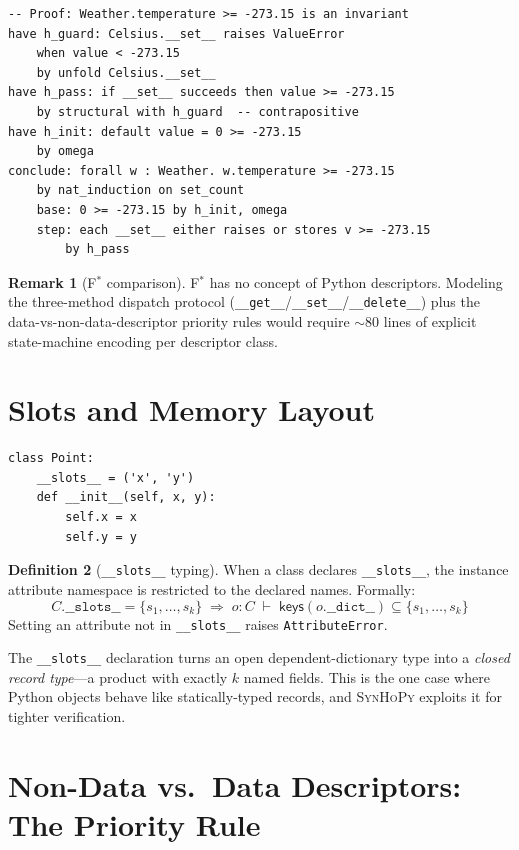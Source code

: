 \documentclass[11pt,a4paper]{report}
\theoremstyle{definition}
\newtheorem{definition}{Definition}[chapter]
\newtheorem{remark}[definition]{Remark}
\theoremstyle{plain}
\newcommand{\fstar}{F$^{*}$}
\newcommand{\synhopy}{\textsc{SynHoPy}}
\begin{document}
\begin{lstlisting}[style=proof]
-- Proof: Weather.temperature >= -273.15 is an invariant
have h_guard: Celsius.__set__ raises ValueError
    when value < -273.15
    by unfold Celsius.__set__
have h_pass: if __set__ succeeds then value >= -273.15
    by structural with h_guard  -- contrapositive
have h_init: default value = 0 >= -273.15
    by omega
conclude: forall w : Weather. w.temperature >= -273.15
    by nat_induction on set_count
    base: 0 >= -273.15 by h_init, omega
    step: each __set__ either raises or stores v >= -273.15
        by h_pass
\end{lstlisting}

\begin{remark}[\fstar{} comparison]
\fstar{} has no concept of Python descriptors.  Modeling the three-method
dispatch protocol (\texttt{\_\_get\_\_}/\texttt{\_\_set\_\_}/\texttt{\_\_delete\_\_})
plus the data-vs-non-data-descriptor priority rules would require $\sim$80
lines of explicit state-machine encoding per descriptor class.
\end{remark}

\section{Slots and Memory Layout}

\begin{lstlisting}[style=python]
class Point:
    __slots__ = ('x', 'y')
    def __init__(self, x, y):
        self.x = x
        self.y = y
\end{lstlisting}

\begin{definition}[\texttt{\_\_slots\_\_} typing]
When a class declares \texttt{\_\_slots\_\_}, the instance attribute namespace
is restricted to the declared names.  Formally:
\[
  C.\texttt{\_\_slots\_\_} = \{s_1, \ldots, s_k\}
  \;\Longrightarrow\;
  o : C \;\vdash\; \mathsf{keys}(o.\texttt{\_\_dict\_\_}) \subseteq \{s_1, \ldots, s_k\}
\]
Setting an attribute not in \texttt{\_\_slots\_\_} raises \texttt{AttributeError}.
\end{definition}

The \texttt{\_\_slots\_\_} declaration turns an open dependent-dictionary type
into a \emph{closed record type}---a product with exactly $k$ named fields.
This is the one case where Python objects behave like statically-typed records,
and \synhopy{} exploits it for tighter verification.

\section{Non-Data vs.\ Data Descriptors: The Priority Rule}
\end{document}
